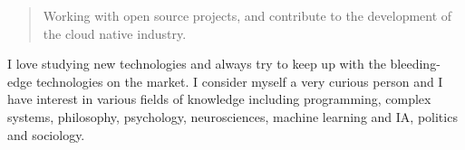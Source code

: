 \begin{quote}
Working with open source projects, and contribute to the development of the cloud native industry.
\end{quote}












I love studying new technologies and always try to keep up with the bleeding-edge technologies on the market. I consider myself a very curious person and I have interest in various fields of knowledge including programming, complex systems, philosophy, psychology, neurosciences, machine learning and IA, politics and sociology.
